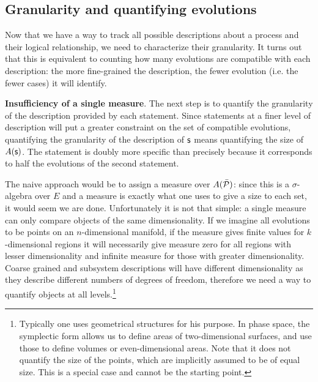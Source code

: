 \documentclass[10pt, onecolumn, longbibliography, nofootinbib]{revtex4-2}
\begin{document}
\subsection{Granularity and quantifying evolutions}

Now that we have a way to track all possible descriptions about a process and their logical relationship, we need to characterize their granularity. It turns out that this is equivalent to counting how many evolutions are compatible with each description: the more fine-grained the description, the fewer evolution (i.e. the fewer cases) it will identify.

\textbf{Insufficiency of a single measure}. The next step is to quantify the granularity of the description provided by each statement. Since statements at a finer level of description will put a greater constraint on the set of compatible evolutions, quantifying the granularity of the description of $\stmt$ means quantifying the size of $A(\stmt)$. The statement  is doubly more specific than  precisely because it corresponds to half the evolutions of the second statement.

The naive approach would be to assign a measure over $A(\tdomain[P])$: since this is a $\sigma$-algebra over $E$ and a measure is exactly what one uses to give a size to each set, it would seem we are done. Unfortunately it is not that simple: a single measure can only compare objects of the same dimensionality. If we imagine all evolutions to be points on an $n$-dimensional manifold, if the measure gives finite values for $k$-dimensional regions it will necessarily give measure zero for all regions with lesser dimensionality and infinite measure for those with greater dimensionality. Coarse grained and subsystem descriptions will have different dimensionality as they describe different numbers of degrees of freedom, therefore we need a way to quantify objects at all levels.\footnote{Typically one uses geometrical structures for his purpose. In phase space, the symplectic form allows us to define areas of two-dimensional surfaces, and use those to define volumes or even-dimensional areas. Note that it does not quantify the size of the points, which are implicitly assumed to be of equal size. This is a special case and cannot be the starting point.}
\end{document}
